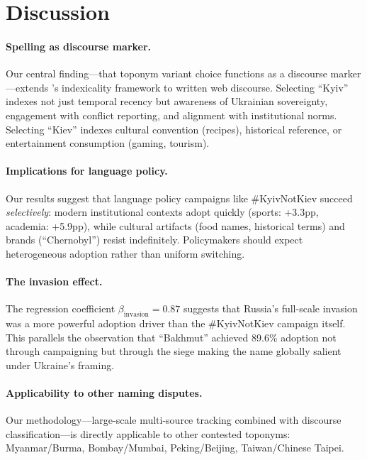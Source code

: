 \documentclass{article}
\begin{document}
\section{Discussion}
\label{sec:discussion}

\paragraph{Spelling as discourse marker.} Our central finding---that toponym variant choice functions as a discourse marker---extends \citeauthor{eckert-2008}'s indexicality framework to written web discourse. Selecting ``Kyiv'' indexes not just temporal recency but awareness of Ukrainian sovereignty, engagement with conflict reporting, and alignment with institutional norms. Selecting ``Kiev'' indexes cultural convention (recipes), historical reference, or entertainment consumption (gaming, tourism).

\paragraph{Implications for language policy.} Our results suggest that language policy campaigns like \#KyivNotKiev succeed \textit{selectively}: modern institutional contexts adopt quickly (sports: +3.3pp, academia: +5.9pp), while cultural artifacts (food names, historical terms) and brands (``Chernobyl'') resist indefinitely. Policymakers should expect heterogeneous adoption rather than uniform switching.

\paragraph{The invasion effect.} The regression coefficient $\beta_{\text{invasion}} = 0.87$ suggests that Russia's full-scale invasion was a more powerful adoption driver than the \#KyivNotKiev campaign itself. This parallels the observation that ``Bakhmut'' achieved 89.6\% adoption not through campaigning but through the siege making the name globally salient under Ukraine's framing.

\paragraph{Applicability to other naming disputes.} Our methodology---large-scale multi-source tracking combined with discourse classification---is directly applicable to other contested toponyms: Myanmar/Burma, Bombay/Mumbai, Peking/Beijing, Taiwan/Chinese Taipei.
\end{document}
